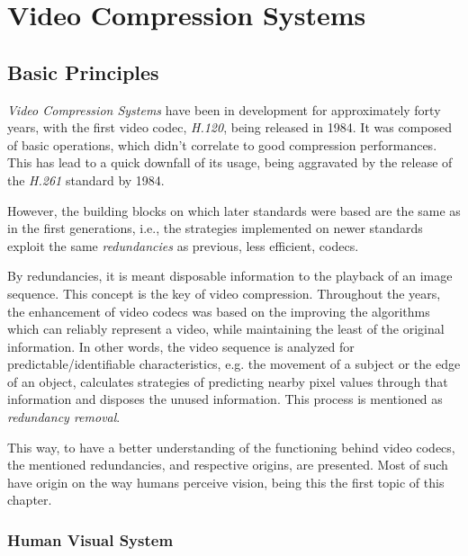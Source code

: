 \cleardoublepage
\chapter{Video Compression Systems}\label{chap:av1}

\section{Basic Principles}

\emph{Video Compression Systems} have been in development for approximately forty years, with the first video codec, \emph{H.120}, being released in 1984. It was composed of basic operations, which didn't correlate to good compression performances. This has lead to a quick downfall of its usage, being aggravated by the release of the \emph{H.261} standard by 1984.

However, the building blocks on which later standards were based are the same as in the first generations, i.e., the strategies implemented on newer standards exploit the same \emph{redundancies} as previous, less efficient, codecs.

By redundancies, it is meant disposable information to the playback of an image sequence. This concept is the key of video compression. Throughout the years, the enhancement of video codecs was based on the improving the algorithms which can reliably represent a video, while maintaining the least of the original information. In other words, the video sequence is analyzed for predictable/identifiable characteristics, e.g. the movement of a subject or the edge of an object, calculates strategies of predicting nearby pixel values through that information and disposes the unused information. This process is mentioned as \emph{redundancy removal}.

This way, to have a better understanding of the functioning behind video codecs, the mentioned redundancies, and respective origins, are presented. Most of such have origin on the way humans perceive vision, being this the first topic of this chapter.

\subsection{Human Visual System} \label{ssec:hvs}


